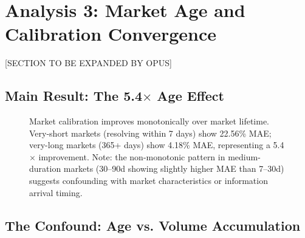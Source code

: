 \section{Analysis 3: Market Age and Calibration Convergence}
\label{sec:analysis3}

[SECTION TO BE EXPANDED BY OPUS]


\subsection{Main Result: The 5.4$\times$ Age Effect}
\label{subsec:a3_finding}

\begin{figure}[h]
\centering
{}
\caption{Market calibration improves monotonically over market lifetime. Very-short markets (resolving within 7 days) show 22.56\% MAE; very-long markets (365+ days) show 4.18\% MAE, representing a 5.4$\times$ improvement. Note: the non-monotonic pattern in medium-duration markets (30--90d showing slightly higher MAE than 7--30d) suggests confounding with market characteristics or information arrival timing.}
\label{fig:age_effect}
\end{figure}

\subsection{The Confound: Age vs. Volume Accumulation}
\label{subsec:a3_confound}

